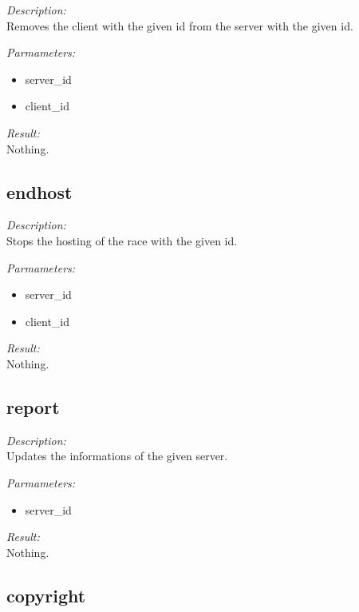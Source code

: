 \begin{description}
\item {\it Description:}\\
Removes the client with the given id from the server with the given id.
\item {\it Parmameters:}
\begin{itemize}
\item server\_id
\item client\_id
\end{itemize}
\item {\it Result:}\\
Nothing.
\end{description}

\subsection{endhost}

\begin{description}
\item {\it Description:}\\
Stops the hosting of the race with the given id.
\item {\it Parmameters:}
\begin{itemize}
\item server\_id
\item client\_id
\end{itemize}
\item {\it Result:}\\
Nothing.
\end{description}

\subsection{report}

\begin{description}
\item {\it Description:}\\
Updates the informations of the given server.
\item {\it Parmameters:}
\begin{itemize}
\item server\_id
\end{itemize}
\item {\it Result:}\\
Nothing.
\end{description}

\subsection{copyright}

